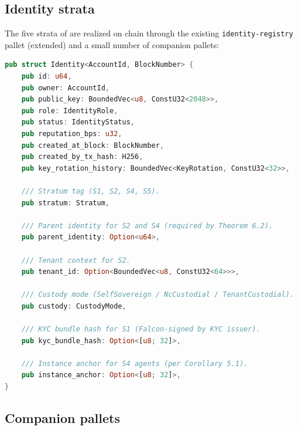 \documentclass[11pt,a4paper,parskip=half-,DIV=12,headings=standardclasses]{scrartcl}
\theoremstyle{ncthm}
\theoremstyle{ncdef}
\begin{document}
\subsection{Identity strata}

The five strata of  are realized on chain
through the existing
\texttt{identity-registry} pallet (extended) and a small number of
companion pallets:

\begin{lstlisting}[language=rust]
pub struct Identity<AccountId, BlockNumber> {
    pub id: u64,
    pub owner: AccountId,
    pub public_key: BoundedVec<u8, ConstU32<2048>>,
    pub role: IdentityRole,
    pub status: IdentityStatus,
    pub reputation_bps: u32,
    pub created_at_block: BlockNumber,
    pub created_by_tx_hash: H256,
    pub key_rotation_history: BoundedVec<KeyRotation, ConstU32<32>>,

    /// Stratum tag (S1, S2, S4, S5).
    pub stratum: Stratum,

    /// Parent identity for S2 and S4 (required by Theorem 6.2).
    pub parent_identity: Option<u64>,

    /// Tenant context for S2.
    pub tenant_id: Option<BoundedVec<u8, ConstU32<64>>>,

    /// Custody mode (SelfSovereign / NcCustodial / TenantCustodial).
    pub custody: CustodyMode,

    /// KYC bundle hash for S1 (Falcon-signed by KYC issuer).
    pub kyc_bundle_hash: Option<[u8; 32]>,

    /// Instance anchor for S4 agents (per Corollary 5.1).
    pub instance_anchor: Option<[u8; 32]>,
}
\end{lstlisting}

\subsection{Companion pallets}
\end{document}

